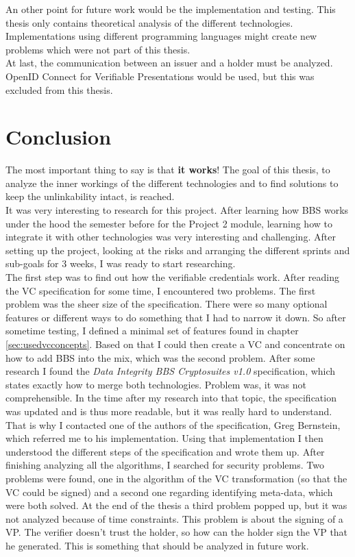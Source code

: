 \documentclass[
	a4paper               %
	,BCOR=0mm            %
	,bibliography=totoc   %
	,listof=totoc         %
	,monolingual
	,twoside=false
]{bfhthesis}              %
\begin{document}
An other point for future work would be the implementation and testing. This thesis only contains theoretical analysis of the different technologies. Implementations using different programming languages might create new problems which were not part of this thesis. \\

At last, the communication between an issuer and a holder must be analyzed. OpenID Connect for Verifiable Presentations would be used, but this was excluded from this thesis.


\chapter{Conclusion}
The most important thing to say is that \textbf{it works}! The goal of this thesis, to analyze the inner workings of the different technologies and to find solutions to keep the unlinkability intact, is reached.\\

It was very interesting to research for this project. After learning how BBS works under the hood the semester before for the Project 2 module, learning how to integrate it with other technologies was very interesting and challenging. After setting up the project, looking at the risks and arranging the different sprints and sub-goals for 3 weeks, I was ready to start researching. \\

The first step was to find out how the verifiable credentials work. After reading the VC specification for some time, I encountered two problems. The first problem was the sheer size of the specification. There were so many optional features or different ways to do something that I had to narrow it down. So after sometime testing, I defined a minimal set of features found in chapter \ref{sec:usedvcconcepts}. Based on that I could then create a VC and concentrate on how to add BBS into the mix, which was the second problem. After some research I found the \textit{Data Integrity BBS Cryptosuites v1.0}\cite{bbsvc} specification, which states exactly how to merge both technologies. Problem was, it was not comprehensible. In the time after my research into that topic, the specification was updated and is thus more readable, but it was really hard to understand. That is why I contacted one of the authors of the specification, Greg Bernstein, which referred me to his implementation. Using that implementation I then understood the different steps of the specification and wrote them up. After finishing analyzing all the algorithms, I searched for security problems. Two problems were found, one in the algorithm of the VC transformation (so that the VC could be signed) and a second one regarding identifying meta-data, which were both solved. At the end of the thesis a third problem popped up, but it was not analyzed because of time constraints. This problem is about the signing of a VP. The verifier doesn't trust the holder, so how can the holder sign the VP that he generated. This is something that should be analyzed in future work. \\
\end{document}
